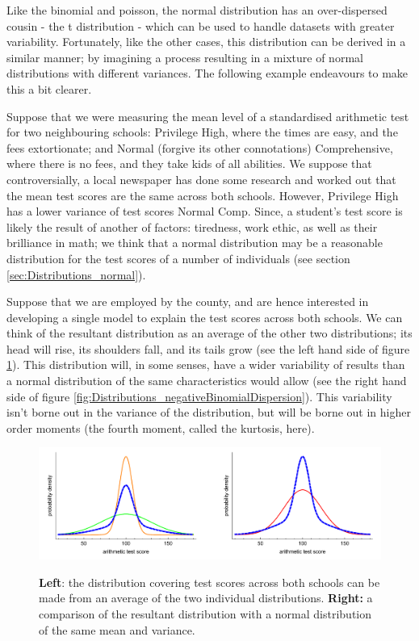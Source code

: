 \documentclass[11pt,fullpage]{book}
\begin{document}
Like the binomial and poisson, the normal distribution has an over-dispersed cousin - the t distribution - which can be used to handle datasets with greater variability. Fortunately, like the other cases, this distribution can be derived in a similar manner; by imagining a process resulting in a mixture of normal distributions with different variances. The following example endeavours to make this a bit clearer.

Suppose that we were measuring the mean level of a standardised arithmetic test for two neighbouring schools: Privilege High, where the times are easy, and the fees extortionate; and Normal (forgive its other connotations) Comprehensive, where there is no fees, and they take kids of all abilities. We suppose that controversially, a local newspaper has done some research and worked out that the mean test scores are the same across both schools. However, Privilege High has a lower variance of test scores Normal Comp. Since, a student's test score is likely the result of another of factors: tiredness, work ethic, as well as their brilliance in math; we think that a normal distribution may be a reasonable distribution for the test scores of a number of individuals (see section \ref{sec:Distributions_normal}). 

Suppose that we are employed by the county, and are hence interested in developing a single model to explain the test scores across both schools. We can think of the resultant distribution as an average of the other two distributions; its head will rise, its shoulders fall, and its tails grow (see the left hand side of figure \ref{fig:Distributions_tArithmeticDispersion}). This distribution will, in some senses, have a wider variability of results than a normal distribution of the same characteristics would allow (see the right hand side of figure \ref{fig:Distributions_negativeBinomialDispersion}). This variability isn't borne out in the variance of the distribution, but will be borne out in higher order moments (the fourth moment, called the kurtosis, here). 

\begin{figure}
\centering
\scalebox{0.5} 
{\includegraphics{Distributions_tArithmeticDispersion.pdf}}
\caption{\textbf{Left}: the distribution covering test scores across both schools can be made from an average of the two individual distributions. \textbf{Right:} a comparison of the resultant distribution with a normal distribution of the same mean and variance.}\label{fig:Distributions_tArithmeticDispersion}
\end{figure}
\end{document}
